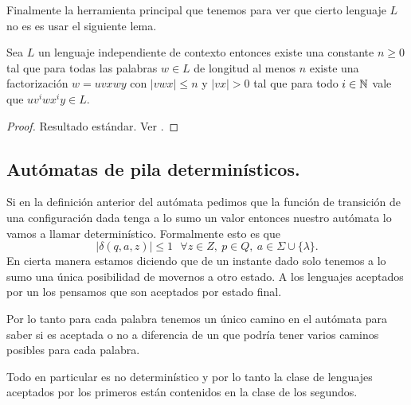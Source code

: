 \documentclass[tesis.tex]{subfiles}
\begin{document}
Finalmente la herramienta principal que tenemos para ver que cierto lenguaje $L$ no es \ic es usar el siguiente lema.

\begin{lema}[Pumping] \label{pumping}
	Sea $L$ un lenguaje independiente de contexto entonces existe una constante $n \ge 0$ tal que para todas las palabras $w \in L$ de longitud al menos $n$ existe una factorización $w = uvxwy$ con $|vwx| \le n$ y $|vx| > 0$ tal que para todo $i \in \mathbb{N}$ vale que $uv^iwx^iy \in L$.
\end{lema}

\begin{proof}
	Resultado estándar. Ver \cite{hopcraft-ullman}.
\end{proof}

\subsection{Autómatas de pila determinísticos.} Si en la definición anterior del autómata pedimos que la función de transición de una configuración dada tenga a lo sumo un valor entonces nuestro autómata lo vamos a llamar determinístico. Formalmente esto es que 
\[
|\delta(q,a, z)| \le 1 \ \ \ \forall z \in Z, \ p \in Q, \ a \in \Sigma \cup \{ \lambda \}.
\]
En cierta manera estamos diciendo que de un instante dado solo tenemos a lo sumo una única posibilidad de movernos a otro estado. A los lenguajes aceptados por un \APD los pensamos que son aceptados por estado final.


 Por lo tanto para cada palabra tenemos un único camino en el autómata para saber si es aceptada o no a diferencia de un \APND  que podría tener varios caminos posibles para cada palabra.
\begin{obs}
	Todo \APD en particular es no determinístico y por lo tanto la clase de lenguajes aceptados por los primeros están contenidos en la clase de los segundos.
\end{obs}
\end{document}
